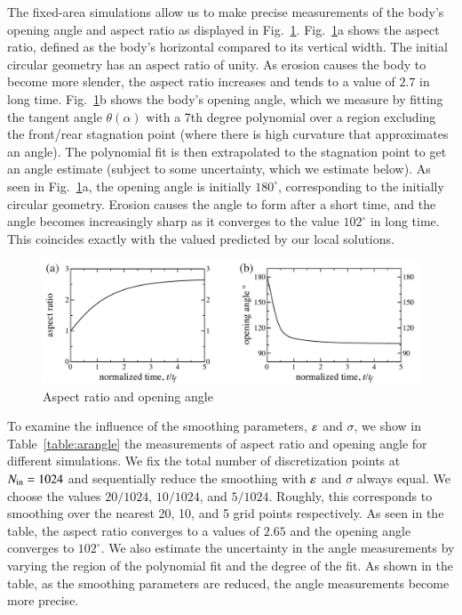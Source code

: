 \documentclass[preprint, 10pt]{elsarticle}
\begin{document}
The fixed-area simulations allow us to make precise measurements of the
body's opening angle and aspect ratio as displayed in
Fig.~\ref{fig:arangle}. Fig.~\ref{fig:arangle}a shows the aspect
ratio, defined as the body's horizontal compared to its vertical width.
The initial circular geometry has an aspect ratio of unity. As erosion
causes the body to become more slender, the aspect ratio increases and
tends to a value of $2.7$ in long time. Fig.~\ref{fig:arangle}b shows
the body's opening angle, which we measure by fitting the tangent angle
$\theta(\alpha)$ with a 7th degree polynomial over a region excluding
the front/rear stagnation point (where there is high curvature that
approximates an angle). The polynomial fit is then extrapolated to the
stagnation point to get an angle estimate (subject to some uncertainty,
which we estimate below). As seen in Fig.~\ref{fig:arangle}a, the
opening angle is initially $180^\circ$, corresponding to the initially
circular geometry. Erosion causes the angle to form after a short time,
and the angle becomes increasingly sharp as it converges to the value
$102^\circ$ in long time. This coincides exactly with the valued
predicted by our local solutions.


\begin{figure}%
\begin{center}
\includegraphics[width = 0.8 \textwidth]{./figs/arangle.pdf}
\caption{Aspect ratio and opening angle}
\label{fig:arangle}
\end{center}
\end{figure}

To examine the influence of the smoothing parameters, $\varepsilon$ and
$\sigma$, we show in Table~\ref{table:arangle} the measurements of
aspect ratio and opening angle for different simulations. We fix the
total number of discretization points at $N_{\mathrm{in}} = 1024$ and
sequentially reduce the smoothing with $\varepsilon$ and $\sigma$ always equal.
We choose the values $20/1024$, $10/1024$, and $5/1024$. Roughly, this
corresponds to smoothing over the nearest 20, 10, and 5 grid points
respectively. As seen in the table, the aspect ratio converges to a
values of $2.65$ and the opening angle converges to $102^{\circ}$. We
also estimate the uncertainty in the angle measurements by varying the
region of the polynomial fit and the degree of the fit. As shown in the
table, as the smoothing parameters are reduced, the angle measurements
become more
precise.
\end{document}
